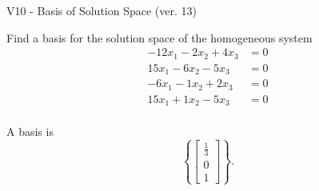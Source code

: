 \begin{exercise}
  \begin{exerciseTitle}V10 - Basis of Solution Space (ver. 13)\end{exerciseTitle}
  \begin{exerciseStatement}
    Find a basis for the solution space of the homogeneous system 
\begin{align*}
 -12 x_ 1 -2 x_ 2 + 4 x_ 3 &= 0  \\ 
  15 x_ 1 -6 x_ 2 -5 x_ 3 &= 0  \\ 
  -6 x_ 1 -1 x_ 2 + 2 x_ 3 &= 0  \\ 
  15 x_ 1 + 1 x_ 2 -5 x_ 3 &= 0  \\ 
 \end{align*}


 
  \end{exerciseStatement}

  \begin{exerciseAnswer}
   A basis is   
\[\left\{\left[\begin{array}{c}
\frac{1}{3} \\
0 \\
1
\end{array}\right]\right\}.\]

  


  \end{exerciseAnswer}
\end{exercise}